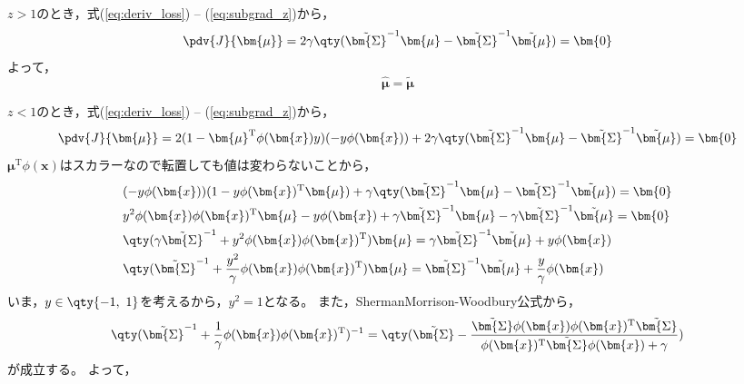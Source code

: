 \documentclass[class=jsarticle, crop=false, dvipdfmx, fleqn]{standalone}
\begin{document}
\(z > 1\)のとき，式(\ref{eq:deriv_loss}) -- (\ref{eq:subgrad_z})から，
\begin{equation}
    \pdv{J}{\bm{\mu}}
        = 2 \gamma \qty(\tilde{\bm{\Sigma}}^{-1} \bm{\mu} - \tilde{\bm{\Sigma}}^{-1} \tilde{\bm{\mu}})
        = \bm{0}
\end{equation}
よって，
\begin{equation}
    \hat{\bm{\mu}} = \tilde{\bm{\mu}}
    \label{eq:mu_hat_z_qt_1}
\end{equation}

\(z < 1\)のとき，式(\ref{eq:deriv_loss}) -- (\ref{eq:subgrad_z})から，
\begin{equation}
    \pdv{J}{\bm{\mu}}
        = 2 (1 - \bm{\mu}^\mathrm{T} \phi(\bm{x}) y) (- y \phi(\bm{x})) + 2 \gamma \qty(\tilde{\bm{\Sigma}}^{-1} \bm{\mu} - \tilde{\bm{\Sigma}}^{-1} \tilde{\bm{\mu}})
        = \bm{0}
\end{equation}
\(\bm{\mu}^\mathrm{T} \phi(\bm{x})\)はスカラーなので転置しても値は変わらないことから，
\begin{align}
    & (- y \phi(\bm{x})) (1 - y \phi(\bm{x})^\mathrm{T} \bm{\mu}) + \gamma \qty(\tilde{\bm{\Sigma}}^{-1} \bm{\mu} - \tilde{\bm{\Sigma}}^{-1} \tilde{\bm{\mu}})
    = \bm{0} \\
    & y^2 \phi(\bm{x}) \phi(\bm{x})^\mathrm{T} \bm{\mu} - y \phi(\bm{x}) + \gamma \tilde{\bm{\Sigma}}^{-1} \bm{\mu} - \gamma \tilde{\bm{\Sigma}}^{-1} \tilde{\bm{\mu}} = \bm{0} \\
    & \qty(\gamma \tilde{\bm{\Sigma}}^{-1} + y^2 \phi(\bm{x}) \phi(\bm{x})^\mathrm{T}) \bm{\mu} = \gamma \tilde{\bm{\Sigma}}^{-1} \tilde{\bm{\mu}} + y \phi(\bm{x}) \\
    & \qty(\tilde{\bm{\Sigma}}^{-1} + \frac{y^2}{\gamma} \phi(\bm{x}) \phi(\bm{x})^\mathrm{T}) \bm{\mu} = \tilde{\bm{\Sigma}}^{-1} \tilde{\bm{\mu}} + \frac{y}{\gamma} \phi(\bm{x})
\end{align}
いま，\(y \in \qty{-1,\ 1}\)を考えるから，\(y^2 = 1\)となる。
また，ShermanMorrison-Woodbury公式から，
\begin{equation}
    \qty(\tilde{\bm{\Sigma}}^{-1} + \frac{1}{\gamma} \phi(\bm{x}) \phi(\bm{x})^\mathrm{T})^{-1} = \qty(\tilde{\bm{\Sigma}} - \frac{\tilde{\bm{\Sigma}} \phi(\bm{x}) \phi(\bm{x})^\mathrm{T} \tilde{\bm{\Sigma}}}{\phi(\bm{x})^\mathrm{T} \tilde{\bm{\Sigma}} \phi(\bm{x}) + \gamma})
\end{equation}
が成立する。
よって，
\end{document}
